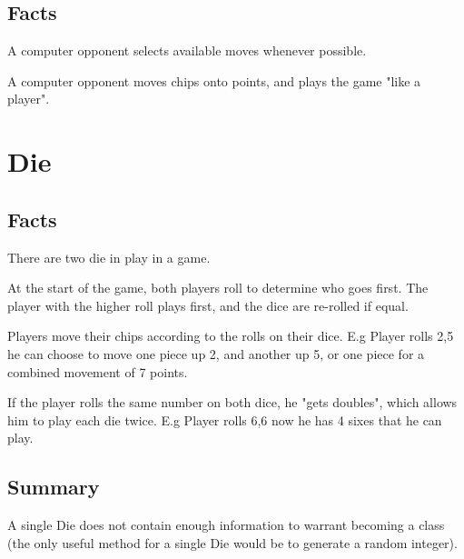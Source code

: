 \documentclass{report}
\begin{document}
    \subsection{Facts}

    \begin{dashed}
        \item A computer opponent selects available moves whenever possible.
        \item A computer opponent moves chips onto points, and plays
        the game "like a player".
    \end{dashed}





    \newpage
    \section{Die}

    \subsection{Facts}

    \begin{dashed}
        \item There are two die in play in a game.
        \item At the start of the game, both players roll to determine who goes first.
        The player with the higher roll plays first, and the dice are re-rolled if equal.
        \item Players move their chips according to the rolls on their dice.
        E.g Player rolls 2,5 he can choose to move one piece up 2, and another up 5,
        or one piece for a combined movement of 7 points.
        \item If the player rolls the same number on both dice, he "gets doubles", which
        allows him to play each die twice.
        E.g Player rolls 6,6 now he has 4 sixes that he can play.
        \item
    \end{dashed}

    \subsection{Summary}

    A single Die does not contain enough information to warrant becoming a class (the
    only useful method for a single Die would be to generate a random integer).
\end{document}
